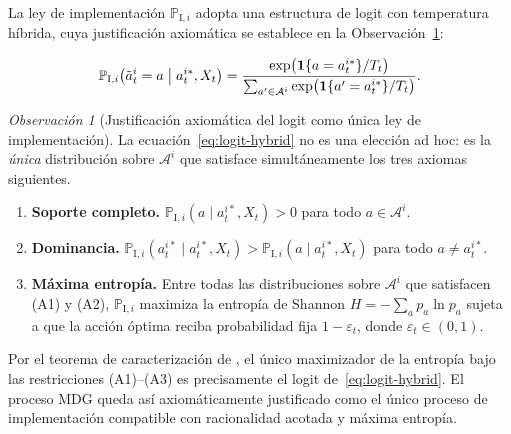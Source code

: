 \documentclass[12pt]{article}
\providecommand{\textcite}{\citet}
\theoremstyle{definition}
\theoremstyle{remark}
\newtheorem{remark}[theorem]{Observación}
\newcommand{\ProbI}[1]{\mathbb{P}_{\mathrm{I},#1}}
\newcommand{\1}{\mathbf{1}}
\begin{document}
La ley de implementación $\ProbI{i}$ adopta una estructura de logit con temperatura híbrida, cuya justificación axiomática se establece en la Observación~\ref{rem:axiomas-logit}:

\begin{equation}
\label{eq:logit-hybrid}
\ProbI{i}\bigl(\tilde{a}_t^i = a \bigm| a_t^{i\ast}, X_t\bigr) = \frac{\exp\bigl(\mathbf{1}\{a = a_t^{i\ast}\} / T_t\bigr)}{\sum_{a' \in \mathcal{A}^i} \exp\bigl(\mathbf{1}\{a' = a_t^{i\ast}\} / T_t\bigr)}.
\end{equation}

\begin{remark}[Justificación axiomática del logit como única ley de implementación]
\label{rem:axiomas-logit}
La ecuación~\eqref{eq:logit-hybrid} no es una elección ad hoc: es la \emph{única} distribución sobre $\mathcal{A}^i$ que satisface simultáneamente los tres axiomas siguientes.
\begin{enumerate}
  \item[\textup{(A1)}] \textbf{Soporte completo.} $\ProbI{i}(a \mid a_t^{i\ast}, X_t) > 0$ para todo $a \in \mathcal{A}^i$.
  \item[\textup{(A2)}] \textbf{Dominancia.} $\ProbI{i}(a_t^{i\ast} \mid a_t^{i\ast}, X_t) > \ProbI{i}(a \mid a_t^{i\ast}, X_t)$ para todo $a \neq a_t^{i\ast}$.
  \item[\textup{(A3)}] \textbf{Máxima entropía.} Entre todas las distribuciones sobre $\mathcal{A}^i$ que satisfacen \textup{(A1)} y \textup{(A2)}, $\ProbI{i}$ maximiza la entropía de Shannon $H = -\sum_{a} p_a \ln p_a$ sujeta a que la acción óptima reciba probabilidad fija $1 - \varepsilon_t$, donde $\varepsilon_t \in (0,1)$.
\end{enumerate}
Por el teorema de caracterización de \textcite{Jaynes1957Information,Jaynes1957InformationII}, el único maximizador de la entropía bajo las restricciones \textup{(A1)}--\textup{(A3)} es precisamente el logit de~\eqref{eq:logit-hybrid}. El proceso MDG queda así axiomáticamente justificado como el único proceso de implementación compatible con racionalidad acotada y máxima entropía.
\end{remark}
\end{document}
